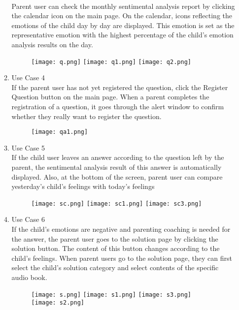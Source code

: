 \documentclass[conference]{IEEEtran}
\begin{document}
\begin{enumerate}
\begin{enumerate}
        \\Parent user can check the monthly sentimental analysis report by clicking the calendar icon on the main page. On the calendar, icons reflecting the emotions of the child day by day are displayed. This emotion is set as the representative emotion with the highest percentage of the child's emotion analysis results on the day.
        \begin{figure}[H]
        \centering
        \texttt{[image: q.png]}
        \texttt{[image: q1.png]}
        \texttt{[image: q2.png]}
        \end{figure}
        \item Use Case 4
        \\If the parent user has not yet registered the question, click the Register Question button on the main page. When a parent completes the registration of a question, it goes through the alert window to confirm whether they really want to register the question.
        \begin{figure}[H]
        \centering
        \texttt{[image: qa1.png]}
        \end{figure}
        \item Use Case 5
        \\If the child user leaves an answer according to the question left by the parent, the sentimental analysis result of this answer is automatically displayed. Also, at the bottom of the screen, parent user can compare yesterday's child's feelings with today's feelings
        \begin{figure}[H]
        \centering
        \texttt{[image: sc.png]}
        \texttt{[image: sc1.png]}
        \texttt{[image: sc3.png]}
        \end{figure}
        \item Use Case 6
        \\If the child's emotions are negative and parenting coaching is needed for the answer, the parent user goes to the solution page by clicking the solution button. The content of this button changes according to the child's feelings. When parent users go to the solution page, they can first select the child's solution category and select contents of the specific audio book.
        \begin{figure}[H]
        \centering
        \texttt{[image: s.png]}
        \texttt{[image: s1.png]}
        \texttt{[image: s3.png]}
        \texttt{[image: s2.png]}

\end{figure}
\end{enumerate}
\end{enumerate}
\end{document}
